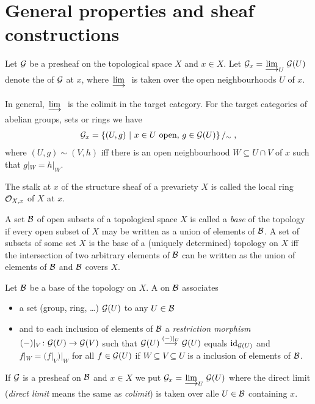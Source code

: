 \documentclass[a4paper,parskip=half,numbers=enddot, DIV=12]{scrreprt}
\begin{document}
\section{General properties and sheaf constructions}
\begin{defi}[Stalk]
    Let $\mathcal{G}$ be a presheaf on the topological space $X$ and $x\in X$. Let $\Gg_x = \colimit[U] \Gg(U)$ denote the  of $\mathcal{G}$ at $x$, where $\colimit$ is taken over the open neighbourhoods $U$ of $x$.
\end{defi}
\begin{rem*}
    In general, $\colimit$ is the colimit in the target category. For the target categories of abelian groups, sets or rings we have
    \begin{align*}
        \mathcal{G}_x = \left\{(U,g) \ \middle|\  x\in U \text{ open, } g\in \mathcal{G}(U)\right\}/_\sim\;,
    \end{align*}
    where $(U,g)\sim (V,h)$ iff there is an open neighbourhood $W\subseteq U\cap V$ of $x$ such that $g|_W = h|_W$. 
\end{rem*}
\begin{example}
    The stalk at $x$ of the structure sheaf of a prevariety $X$ is called the local ring $\mathcal{O}_{X,x}$ of $X$ at $x$.
\end{example}
\begin{rem*}
    A set $\mathcal{B}$ of open subsets of a topological space $X$ is called a \emph{base} of the topology if every open subset of $X$ may be written as a union of elements of $\mathcal{B}$. A set of subsets of some set $X$ is the base of a (uniquely determined) topology on $X$ iff the intersection of two arbitrary elements of $\mathcal{B}$ can be written as the union of elements of $\mathcal{B}$ and $\mathcal{B}$ covers $X$.
\end{rem*}
\begin{defi}
    Let $\mathcal{B}$ be a base of the topology on $X$. A  on $\mathcal{B}$ associates
    \begin{itemize}
    	\item a set (group, ring, \ldots) $\mathcal{G}(U)$ to any $U\in \mathcal{B}$
    	\item and to each inclusion of elements of $\mathcal{B}$ a \emph{restriction morphism}  		$(-)|_V\colon\Gg(U) \morphism \Gg(V)$
    	such that $\Gg(U) \morphism[(-)|_U]\Gg(U)$ equals $\operatorname{id}_{\mathcal{G}(U)}$ and $f|_W = (f|_V)|_W$ for all $f\in \mathcal{G}(U)$ if $W\subseteq V\subseteq U$ is a inclusion of elements of $\mathcal{B}$. 
    \end{itemize}
	 If $\mathcal{G}$ is a presheaf on $\mathcal{B}$ and $x\in X$ we put $\Gg_x = \colimit[U] \Gg(U)$ where the direct limit (\emph{direct limit} means the same as \emph{colimit}) is taken over alle $U\in \mathcal{B}$ containing $x$.
\end{defi}
\end{document}
